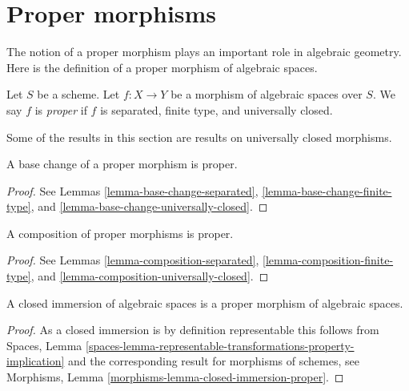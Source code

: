 \section{Proper morphisms}
\label{section-proper}

\noindent
The notion of a proper morphism plays an important role in algebraic geometry.
Here is the definition of a proper morphism of algebraic spaces.

\begin{definition}
\label{definition-proper}
Let $S$ be a scheme.
Let $f : X \to Y$ be a morphism of algebraic spaces over $S$.
We say $f$ is {\it proper} if $f$ is separated, finite type, and
universally closed.
\end{definition}

\noindent
Some of the results in this section are results on universally closed
morphisms.

\begin{lemma}
\label{lemma-base-change-proper}
A base change of a proper morphism is proper.
\end{lemma}

\begin{proof}
See
Lemmas \ref{lemma-base-change-separated},
\ref{lemma-base-change-finite-type}, and
\ref{lemma-base-change-universally-closed}.
\end{proof}

\begin{lemma}
\label{lemma-composition-proper}
A composition of proper morphisms is proper.
\end{lemma}

\begin{proof}
See
Lemmas \ref{lemma-composition-separated},
\ref{lemma-composition-finite-type}, and
\ref{lemma-composition-universally-closed}.
\end{proof}

\begin{lemma}
\label{lemma-closed-immersion-proper}
A closed immersion of algebraic spaces is a proper morphism of
algebraic spaces.
\end{lemma}

\begin{proof}
As a closed immersion is by definition representable this follows from
Spaces,
Lemma \ref{spaces-lemma-representable-transformations-property-implication}
and the corresponding result for morphisms of schemes, see
Morphisms, Lemma \ref{morphisms-lemma-closed-immersion-proper}.
\end{proof}

